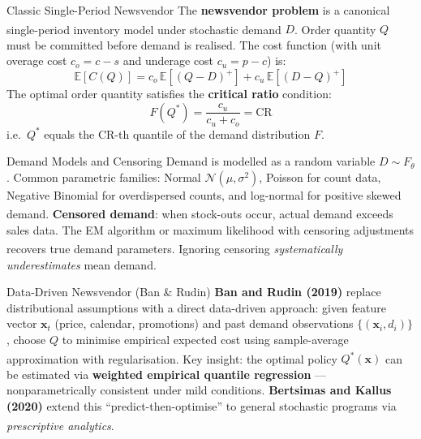 \begin{v3topic}{Classic Single-Period Newsvendor}
    The \textbf{newsvendor problem} is a canonical single-period inventory model under stochastic demand $D$\textsuperscript{\cite[][pp.~537--541]{hillierIntroductionOperationsResearch2020}}.
    Order quantity $Q$ must be committed before demand is realised.
    The cost function (with unit overage cost $c_o = c - s$ and underage cost $c_u = p - c$) is:
    \begin{equation}
        \mathbb{E}[C(Q)] = c_o\,\mathbb{E}[(Q-D)^+] + c_u\,\mathbb{E}[(D-Q)^+]
    \end{equation}
    The optimal order quantity satisfies the \textbf{critical ratio} condition:
    \begin{equation}
        F(Q^*) = \frac{c_u}{c_u + c_o} = \text{CR}
    \end{equation}
    i.e.\ $Q^*$ equals the $\text{CR}$-th quantile of the demand distribution $F$.

\end{v3topic}
\begin{v3topic}{Demand Models and Censoring}
    Demand is modelled as a random variable $D \sim F_\theta$. Common parametric families: Normal $\mathcal{N}(\mu,\sigma^2)$, Poisson for count data, Negative Binomial for overdispersed counts, and log-normal for positive skewed demand\textsuperscript{\cite[][p.~540]{hillierIntroductionOperationsResearch2020}}.
    \textbf{Censored demand}: when stock-outs occur, actual demand exceeds sales data. The EM algorithm or maximum likelihood with censoring adjustments recovers true demand parameters\textsuperscript{\cite[][pp.~490--495]{porteusFundamentationsStochasticInventory2002}}.
    Ignoring censoring \emph{systematically underestimates} mean demand.

\end{v3topic}
\begin{v3topic}{Data-Driven Newsvendor (Ban \& Rudin)}
    \textbf{Ban and Rudin (2019)} replace distributional assumptions with a direct data-driven approach: given feature vector $\mathbf{x}_t$ (price, calendar, promotions) and past demand observations $\{(\mathbf{x}_i, d_i)\}$, choose $Q$ to minimise empirical expected cost using sample-average approximation with regularisation\textsuperscript{\cite[][pp.~90--108]{banBigDataNewsvendor2019}}.
    Key insight: the optimal policy $Q^*(\mathbf{x})$ can be estimated via \textbf{weighted empirical quantile regression} --- nonparametrically consistent under mild conditions.
    \textbf{Bertsimas and Kallus (2020)} extend this ``predict-then-optimise'' to general stochastic programs via \emph{prescriptive analytics}\textsuperscript{\cite[][pp.~1025--1044]{bertsimasPredictivePrescriptiveAnalytics2020}}.

\end{v3topic}

